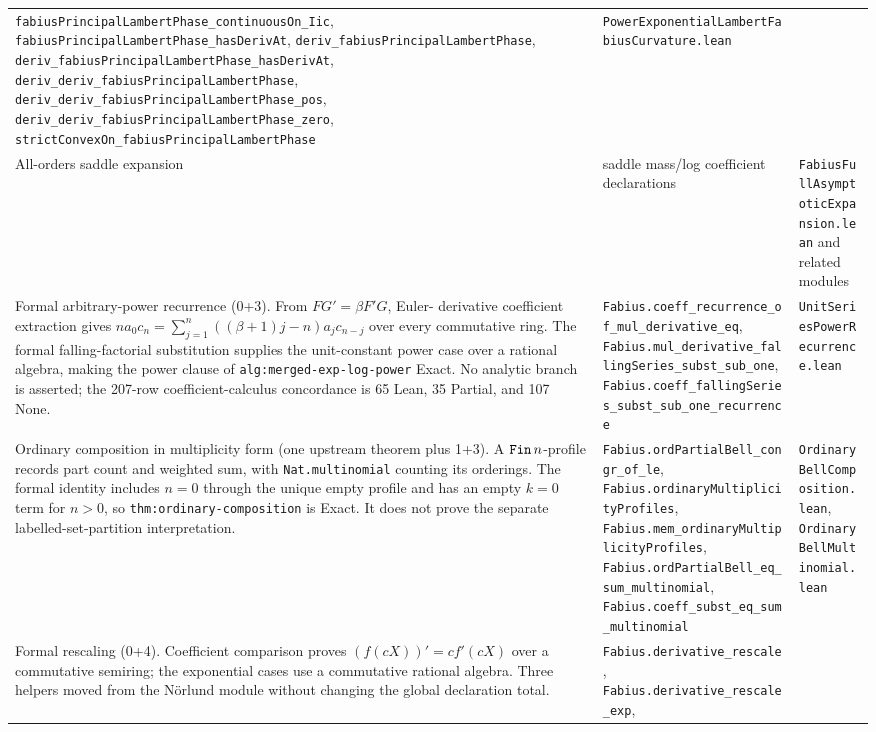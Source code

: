 \documentclass[11pt,oneside]{article}
\theoremstyle{definition}
\theoremstyle{remark}
\newcommand{\lean}[1]{%
  \ifmmode\text{\texttt{\detokenize{#1}}}\else\nolinkurl{#1}\fi}
\begin{document}
\begin{longtable}{@{}p{}p{}p{}@{}}
\nolinkurl{fabiusPrincipalLambertPhase_continuousOn_Iic},
\nolinkurl{fabiusPrincipalLambertPhase_hasDerivAt},
\nolinkurl{deriv_fabiusPrincipalLambertPhase},
\nolinkurl{deriv_fabiusPrincipalLambertPhase_hasDerivAt},
\nolinkurl{deriv_deriv_fabiusPrincipalLambertPhase},
\nolinkurl{deriv_deriv_fabiusPrincipalLambertPhase_pos},
\nolinkurl{deriv_deriv_fabiusPrincipalLambertPhase_zero},
\nolinkurl{strictConvexOn_fabiusPrincipalLambertPhase} &
\nolinkurl{PowerExponentialLambertFabiusCurvature.lean} \\
All-orders saddle expansion & saddle mass/log coefficient declarations & \nolinkurl{FabiusFullAsymptoticExpansion.lean} and related modules \\
Formal arbitrary-power recurrence (0+3).  From \(FG'=\beta F'G\), Euler-
derivative coefficient extraction gives
\(na_0c_n=\sum_{j=1}^n((\beta+1)j-n)a_jc_{n-j}\) over every commutative ring.
The formal falling-factorial substitution supplies the unit-constant power
case over a rational algebra, making the power clause of
\nolinkurl{alg:merged-exp-log-power} Exact.  No analytic branch is asserted;
the 207-row coefficient-calculus concordance is 65 Lean, 35 Partial, and
107 None. &
\nolinkurl{Fabius.coeff_recurrence_of_mul_derivative_eq},
\nolinkurl{Fabius.mul_derivative_fallingSeries_subst_sub_one},
\nolinkurl{Fabius.coeff_fallingSeries_subst_sub_one_recurrence} &
\nolinkurl{UnitSeriesPowerRecurrence.lean} \\
Ordinary composition in multiplicity form (one upstream theorem plus 1+3).
A \(\lean{Fin}\,n\)-profile records part count and weighted sum, with
\nolinkurl{Nat.multinomial} counting its orderings.  The formal identity
includes \(n=0\) through the unique empty profile and has an empty \(k=0\)
term for \(n>0\), so \nolinkurl{thm:ordinary-composition} is Exact.  It does
not prove the separate labelled-set-partition interpretation. &
\nolinkurl{Fabius.ordPartialBell_congr_of_le},
\nolinkurl{Fabius.ordinaryMultiplicityProfiles},
\nolinkurl{Fabius.mem_ordinaryMultiplicityProfiles},
\nolinkurl{Fabius.ordPartialBell_eq_sum_multinomial},
\nolinkurl{Fabius.coeff_subst_eq_sum_multinomial} &
\nolinkurl{OrdinaryBellComposition.lean},
\nolinkurl{OrdinaryBellMultinomial.lean} \\
Formal rescaling (0+4).  Coefficient comparison proves
\((f(cX))'=cf'(cX)\) over a commutative semiring; the exponential cases use a
commutative rational algebra.  Three helpers moved from the N\"orlund module
without changing the global declaration total. &
\nolinkurl{Fabius.derivative_rescale},
\nolinkurl{Fabius.derivative_rescale_exp},

\end{longtable}
\end{document}
